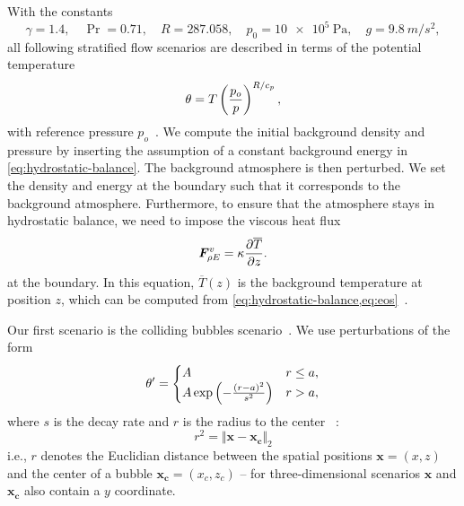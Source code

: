 \documentclass[runningheads]{llncs}
\newcommand{\eqA}{}
\newcommand{\eqB}{(}
\newcommand{\eqMultiA}{(}
\newcommand{\eqMultiB}{)}
\DeclareRobustCommand{\pcrefSingle}[1]{%
\begingroup%
  \renewcommand{\eqA}{(}\renewcommand{\eqB}{}%
\cref{#1}%
\endgroup%
}
\DeclareRobustCommand{\pcrefMulti}[1]{%
\begingroup%
    \renewcommand{\eqMultiA}{}\renewcommand{\eqMultiB}{}%
    (\cref{#1})%
\endgroup%
}
\DeclareRobustCommand{\pcref}[1]{%
\IfSubStr{#1}{,}{\pcrefMulti{#1}}{\pcrefSingle{#1}}%
}
\begin{document}
With  the constants
\begin{equation}\label{eq:atmosphere-constants}
    \gamma = 1.4 ,\quad \Pr =  0.71 ,\quad R = 287.058 ,\quad p_0 = \SI{10e5}{\Pa}, \quad g = \SI{9.8}{m/s^2},
\end{equation}
all following stratified flow scenarios are described in terms of the potential temperature
\begin{equation}
  \theta = T \left( \frac{p_o}{p} \right)^{R/c_p},
\end{equation}
with reference pressure $p_o$~\cite{muller2010adaptive,giraldo2008study}.
%
We compute the initial background density and pressure by inserting the assumption of a constant background energy in \cref{eq:hydrostatic-balance}.
The background atmosphere is then perturbed.
We set the density and energy at the boundary such that it corresponds to the background atmosphere.
Furthermore, to ensure that the atmosphere stays in hydrostatic balance, we need to impose the viscous heat flux
\begin{equation}
  \label{eq:atmosphere-bc}
  \viscFlux_{\QE} = \kappa \pdv{\overline{T}}{z}.%
\end{equation}
at the boundary.
In this equation, $\overline{T}(z)$ is the background temperature at position $z$, which can be computed from \cref{eq:hydrostatic-balance,eq:eos}~\cite{giraldo2008study}.


Our first scenario is the colliding bubbles scenario~\cite{muller2010adaptive}.
We use perturbations of the form
\begin{equation}
  \label{eq:bubbles-pertubation}
  \theta' =
  \begin{cases}
    A & r \leq a, \\
    A \exp \left( - \frac{(r-a)^2}{s^2} \right) & r > a,
    \end{cases}
\end{equation}
where $s$ is the decay rate and $r$  is the radius to the center~\pcref{eq:radius}:
\begin{equation}
  \label{eq:radius}
  r^2 = \Vert \bm{x} - \bm{x_c} \Vert_2 %
\end{equation}
i.e., $r$ denotes the Euclidian distance between the spatial positions $\bm{x} = (x, z)$ and the center of a bubble $\bm{x_c} = (x_c, z_c)$ -- for three-dimensional scenarios $\bm{x}$ and $\bm{x_c}$ also contain a $y$ coordinate.
\end{document}
